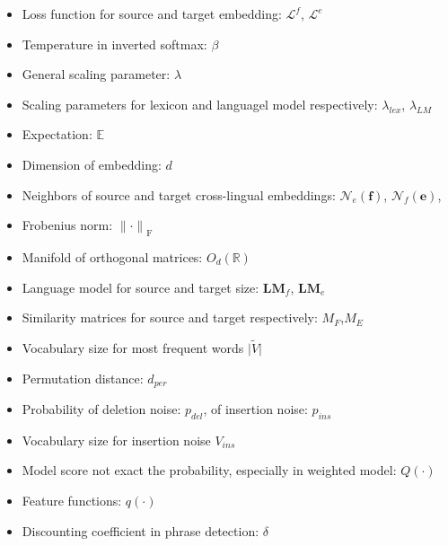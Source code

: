 \begin{itemize}
	\item Loss function for source and target embedding: $\mathcal{L}^f$, $\mathcal{L}^e$
	\item Temperature in inverted softmax: $\beta$ 
	\item General scaling parameter: $\lambda$
	\item Scaling parameters for lexicon and languagel model respectively: $\lambda_{lex}$, $\lambda_{LM}$
	\item Expectation: $\mathbb{E}$
	\item Dimension of embedding: $d$
	\item Neighbors of source and target cross-lingual embeddings: $\mathcal{N}_{e}(\bm{f})$, $\mathcal{N}_{f}(\bm{e})$, 
	\item Frobenius norm: ${\lVert \cdot \rVert}_{\text{F}}$
	\item  Manifold of orthogonal matrices: $ O_d(\mathbb{R})$
	\item Language model for source and target size: $\textbf{LM}_f$, $\textbf{LM}_e$
	\item Similarity matrices for source and target respectively: $M_F$,$M_E$
	\item Vocabulary size for most frequent words ${\lvert \tilde{V} \rvert}$
	\item Permutation distance: $d_{per}$
	\item Probability of deletion noise: $p_{del}$, of insertion noise: $p_{ins}$
	\item Vocabulary size for insertion noise  $V_{ins}$  
	\item Model score not exact the probability, especially in weighted model: $Q(\cdot)$
	\item Feature functions: $q(\cdot)$
	\item Discounting coefficient in phrase detection: $\delta$
\end{itemize}










